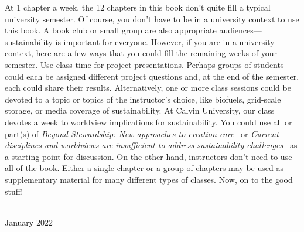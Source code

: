 {    At 1 chapter a week, the 12 chapters in this book don't quite fill a typical 
university semester. 
Of course, you don't have to be in a university context to use this book. 
    A book club or small group are also appropriate audiences---sustainability 
    is important for everyone. 
    However, if you are in a university context, here are a few ways that you could fill the 
    remaining weeks of your semester. 
    Use class time for project presentations. 
    Perhaps groups of students could each be assigned different project questions and, 
    at the end of the semester, each could share their results.
    Alternatively, one or more class sessions could be devoted to a topic or topics 
    of the instructor's choice, like biofuels, grid-scale storage, 
or media coverage of sustainability. 
At Calvin University, our class devotes a week to worldview implications for 
sustainability. 
You could use all or part(s) of \emph{Beyond Stewardship: New approaches to 
creation care}~\citep{Warners:2019aa}
or \emph{Current disciplines and worldviews are insufficient
to address sustainability challenges}~\cite{VanH2019} as a starting point for discussion. 
On the other hand, instructors don't need to use all of the book.
Either a single chapter or a group of chapters may be used as supplementary 
material for many different types of classes.
    Now, on to the good stuff!
      
      \vspace*{2pc}
    \noindent\AUTHORS\\
    \noindent January 2022
  }
  
  
  
  
  
  
  
  \cleardoublepage